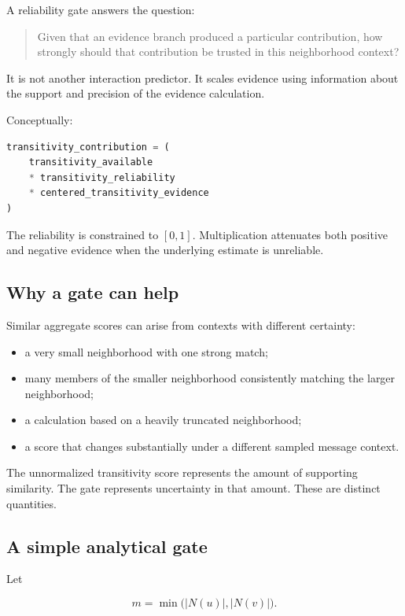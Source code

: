 \documentclass[11pt,a4paper]{article}
\begin{document}
A reliability gate answers the question:

\begin{quote}
Given that an evidence branch produced a particular contribution, how strongly
should that contribution be trusted in this neighborhood context?
\end{quote}

It is not another interaction predictor. It scales evidence using information
about the support and precision of the evidence calculation.

Conceptually:

\begin{lstlisting}[language=Python]
transitivity_contribution = (
    transitivity_available
    * transitivity_reliability
    * centered_transitivity_evidence
)
\end{lstlisting}

The reliability is constrained to $[0,1]$. Multiplication attenuates both
positive and negative evidence when the underlying estimate is unreliable.

\subsection{Why a gate can help}

Similar aggregate scores can arise from contexts with different certainty:

\begin{itemize}
  \item a very small neighborhood with one strong match;
  \item many members of the smaller neighborhood consistently matching the
        larger neighborhood;
  \item a calculation based on a heavily truncated neighborhood;
  \item a score that changes substantially under a different sampled message
        context.
\end{itemize}

The unnormalized transitivity score represents the amount of supporting
similarity. The gate represents uncertainty in that amount. These are distinct
quantities.

\subsection{A simple analytical gate}

Let

\begin{equation}
  m = \min\bigl(|N(u)|,|N(v)|\bigr).
\end{equation}
\end{document}
